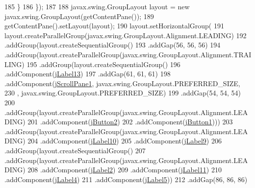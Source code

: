 \begin{DoxyCode}
185             \}
186         \});
187 
188         javax.swing.GroupLayout layout = \textcolor{keyword}{new} javax.swing.GroupLayout(getContentPane());
189         getContentPane().setLayout(layout);
190         layout.setHorizontalGroup(
191             layout.createParallelGroup(javax.swing.GroupLayout.Alignment.LEADING)
192             .addGroup(layout.createSequentialGroup()
193                 .addGap(56, 56, 56)
194                 .addGroup(layout.createParallelGroup(javax.swing.GroupLayout.Alignment.TRAILING)
195                     .addGroup(layout.createSequentialGroup()
196                         .addComponent(\mbox{\hyperlink{classsoftware_1_1parasoftware3_a7b6fbb00c7d61828f62e29c35188d960}{jLabel13}})
197                         .addGap(61, 61, 61)
198                         .addComponent(\mbox{\hyperlink{classsoftware_1_1parasoftware3_aaeb200a8e3cbd49b6ee645ee670e5af7}{jScrollPane1}}, javax.swing.GroupLayout.PREFERRED\_SIZE, 230
      , javax.swing.GroupLayout.PREFERRED\_SIZE)
199                         .addGap(54, 54, 54)
200                         .addGroup(layout.createParallelGroup(javax.swing.GroupLayout.Alignment.LEADING)
201                             .addComponent(\mbox{\hyperlink{classsoftware_1_1parasoftware3_aa69f792b77392d92a3821f9d35b0cf27}{jButton2}})
202                             .addComponent(\mbox{\hyperlink{classsoftware_1_1parasoftware3_a64399e1ff0c22252784a8fb418269e32}{jButton1}})))
203                     .addGroup(layout.createParallelGroup(javax.swing.GroupLayout.Alignment.LEADING)
204                         .addComponent(\mbox{\hyperlink{classsoftware_1_1parasoftware3_ac2e16b2c38aefb461c2f0eced858c1fd}{jLabel10}})
205                         .addComponent(\mbox{\hyperlink{classsoftware_1_1parasoftware3_ac84a161604551842c24b960457e78a4e}{jLabel9}})
206                         .addGroup(layout.createSequentialGroup()
207                             .addGroup(layout.createParallelGroup(javax.swing.GroupLayout.Alignment.LEADING)
208                                 .addComponent(\mbox{\hyperlink{classsoftware_1_1parasoftware3_ada0c2e8fce30c1215e2a30042d386f00}{jLabel2}})
209                                 .addComponent(\mbox{\hyperlink{classsoftware_1_1parasoftware3_ab18f2dadd065ca433f08c878d3ff2b49}{jLabel11}})
210                                 .addComponent(\mbox{\hyperlink{classsoftware_1_1parasoftware3_ae4d1716581a61676309b2c118472da31}{jLabel4}})
211                                 .addComponent(\mbox{\hyperlink{classsoftware_1_1parasoftware3_ab53c1071f13a8fa9a2c371c4b9892253}{jLabel5}}))
212                             .addGap(86, 86, 86)

\end{DoxyCode}
